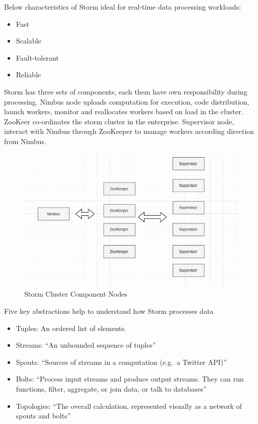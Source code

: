 Below characteristics of Storm ideal for real-time data processing workloads:

\begin{itemize}
\item Fast
\item Scalable
\item Fault-tolerant
\item Reliable
\end{itemize}
 
Storm has three sets of components, each them have own responsibility
during processing. Nimbus node uploads computation for execution, code
distribution, launch workers, monitor and reallocates workers based on
load in the cluster.  ZooKeer co-ordinates the storm cluster in the
enterprise. Supervisor node, interact with Nimbus through ZooKeeper to
manage workers according direction from Nimbus.

\begin{figure}[!ht]
\centering\includegraphics[width=\columnwidth]{images/Storm1.JPG}
  \caption{Storm Cluster Component Nodes}\label{f:storm}
\end{figure}

  
Five key abstractions help to understand how Storm processes data

\begin{itemize}
\item Tuples: An ordered list of elements.
\item Streams: ``An unbounded sequence of
  tuples''~\cite{hid-sp18-514-hwp}
\item Spouts: ``Sources of streams in a computation (e.g.\ a Twitter
  API)''~\cite{hid-sp18-514-hwp}
\item Bolts: ``Process input streams and produce output streams. They
  can run functions, filter, aggregate, or join data, or talk to
  databases''~\cite{hid-sp18-514-hwp}
\item Topologies: ``The overall calculation, represented visually as a
  network of spouts and bolts''~\cite{hid-sp18-514-hwp}
\end{itemize}

